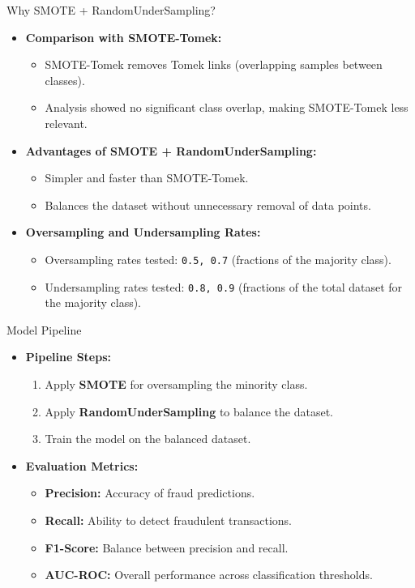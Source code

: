 \documentclass{beamer}
\begin{document}
\begin{frame}{Why SMOTE + RandomUnderSampling?}
    \begin{itemize}
        \item \textbf{Comparison with SMOTE-Tomek:}
        \begin{itemize}
            \item SMOTE-Tomek removes Tomek links (overlapping samples between classes).
            \item Analysis showed no significant class overlap, making SMOTE-Tomek less relevant.
        \end{itemize}
        \item \textbf{Advantages of SMOTE + RandomUnderSampling:}
        \begin{itemize}
            \item Simpler and faster than SMOTE-Tomek.
            \item Balances the dataset without unnecessary removal of data points.
        \end{itemize}
        \item \textbf{Oversampling and Undersampling Rates:}
        \begin{itemize}
            \item Oversampling rates tested: \texttt{0.5, 0.7} (fractions of the majority class).
            \item Undersampling rates tested: \texttt{0.8, 0.9} (fractions of the total dataset for the majority class).
        \end{itemize}
    \end{itemize}
\end{frame}

\begin{frame}{Model Pipeline}
    \begin{itemize}
        \item \textbf{Pipeline Steps:}
        \begin{enumerate}
            \item Apply \textbf{SMOTE} for oversampling the minority class.
            \item Apply \textbf{RandomUnderSampling} to balance the dataset.
            \item Train the model on the balanced dataset.
        \end{enumerate}
        \item \textbf{Evaluation Metrics:}
        \begin{itemize}
            \item \textbf{Precision:} Accuracy of fraud predictions.
            \item \textbf{Recall:} Ability to detect fraudulent transactions.
            \item \textbf{F1-Score:} Balance between precision and recall.
            \item \textbf{AUC-ROC:} Overall performance across classification thresholds.
        \end{itemize}
    \end{itemize}
\end{frame}
\end{document}
